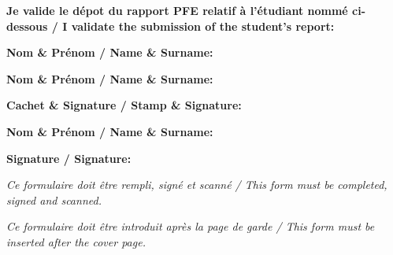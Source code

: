 \thispagestyle{empty}


\noindent \textbf{Je valide le d\'epot du rapport PFE relatif \`a l'\'etudiant nomm\'e ci-dessous / I validate the submission of the student's report:}

\vspace{1cm}

\noindent \textbf{Nom \& Pr\'enom / Name \& Surname:} \dotfill

\vspace{1.5cm}

\begin{tcolorbox}[colback=black!5!white, colframe=black, title=Encadrant Entreprise / Business site Supervisor, width=\textwidth, boxrule=0.5pt]
\textbf{Nom \& Pr\'enom / Name \& Surname:} \dotfill

\vspace{1cm}

\textbf{Cachet \& Signature / Stamp \& Signature:}

\vspace{2cm}
\end{tcolorbox}

\vspace{1.5cm}

\begin{tcolorbox}[colback=black!5!white, colframe=black, title=Encadrant Academique / Academic Supervisor, width=\textwidth, boxrule=0.5pt]
\textbf{Nom \& Pr\'enom / Name \& Surname:} \dotfill

\vspace{1cm}

\textbf{Signature / Signature:}

\vspace{2cm}
\end{tcolorbox}

\vspace{2cm}

\noindent \textit{Ce formulaire doit \^etre rempli, sign\'e et scann\'e / This form must be completed, signed and scanned.}

\vspace{0.2cm}

\noindent \textit{Ce formulaire doit \^etre introduit apr\`es la page de garde / This form must be inserted after the cover page.}

\vfill
